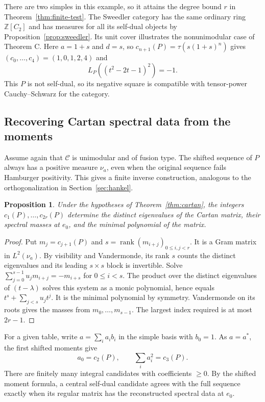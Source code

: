\documentclass[11pt,reqno]{amsart}
\newtheorem{proposition}[theorem]{Proposition}
\theoremstyle{definition}
\newcommand{\C}{\mathcal C}
\newcommand{\ZZ}{\mathbb Z}
\begin{document}
There are two simples in this example, so it attains the degree bound $r$ in Theorem~\ref{thm:finite-test}. The Sweedler category has the same ordinary ring $\ZZ[C_2]$ and has measures for all its self-dual objects by Proposition~\ref{prop:sweedler}. Its unit cover illustrates the nonunimodular case of Theorem C. Here $a=1+s$ and $d=s$, so $c_{n+1}(P)=\tau(s(1+s)^n)$ gives $(c_0,\ldots,c_4)=(1,0,1,2,4)$ and
\[
                         L_P((t^2-2t-1)^2)=-1.
\]
This $P$ is not self-dual, so its negative square is compatible with tensor-power Cauchy--Schwarz for the category.

\subsection{Recovering Cartan spectral data from the moments}
Assume again that $\C$ is unimodular and of fusion type. The shifted sequence of $P$ always has a positive measure $\nu_a$, even
when the original sequence fails Hamburger positivity. This gives a
finite inverse construction, analogous to the orthogonalization in
Section~\ref{sec:hankel}.

\begin{proposition}\label{prop:cartan-recovery}
Under the hypotheses of Theorem~\ref{thm:cartan}, the integers
$c_1(P),\ldots,c_{2r}(P)$ determine the distinct eigenvalues of the
Cartan matrix, their spectral masses at $e_0$, and the minimal polynomial
of the matrix.
\end{proposition}
\begin{proof}
Put $m_j=c_{j+1}(P)$ and $s=\operatorname{rank}(m_{i+j})_{0\le i,j<r}$.
It is a Gram matrix in $L^2(\nu_a)$. By visibility and Vandermonde, its rank $s$ counts the distinct eigenvalues and its leading $s\times s$ block is invertible. Solve $\sum_{j=0}^{s-1}u_jm_{i+j}=-m_{i+s}$ for $0\le i<s$. The product over the distinct eigenvalues of $(t-\lambda)$ solves this system as a monic polynomial, hence equals $t^s+\sum_{j<s}u_jt^j$. It is the minimal polynomial by symmetry. Vandermonde on its roots gives the masses from $m_0,\ldots,m_{s-1}$. The largest index required is at most $2r-1$.
\end{proof}

For a given table, write $a=\sum_i a_i b_i$ in the simple basis with $b_0=1$. As $a=a^*$, the first shifted moments give
\begin{equation}\label{eq:cartan-first}
                   a_0=c_2(P),\qquad \sum_i a_i^2=c_3(P).
\end{equation}
There are finitely many integral candidates with coefficients $\geq0$. By the shifted moment formula, a central self-dual candidate agrees with the full sequence exactly when its regular matrix has the reconstructed spectral data at $e_0$.
\end{document}
